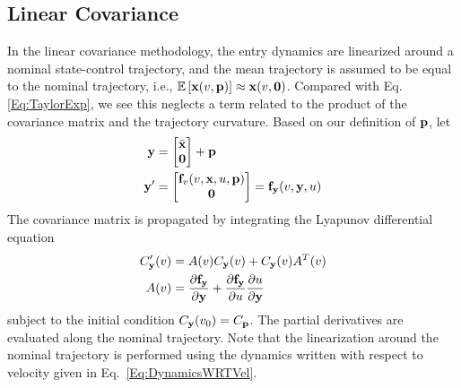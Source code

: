 
\subsection{Linear Covariance}
In the linear covariance methodology, the entry dynamics are linearized around a nominal state-control trajectory, and the mean trajectory is assumed to be equal to the nominal trajectory, i.e., $ \mathbb{E}\left[\mathbf{x}(v,\mathbf{p})\right] \approx \mathbf{x}(v,\mathbf{0}) $. Compared with Eq.\eqref{Eq:TaylorExp}, we see this neglects a term related to the product of the covariance matrix and the trajectory curvature. Based on our definition of $\mathbf{p}$, let 
\begin{align}
\mathbf{y} &= \begin{bmatrix}
		\bar{\mathbf{x}} \\ 
		\mathbf{0}
	 \end{bmatrix} + \mathbf{p}\\
\mathbf{y}' &= \begin{bmatrix}
	\mathbf{f}_{v}(v,\mathbf{x},u,\mathbf{p}) \\ 
	\mathbf{0}
\end{bmatrix} = \mathbf{f}_{\mathbf{y}}(v,\mathbf{y},u)
\end{align}
The covariance matrix is propagated by integrating the Lyapunov differential equation
\begin{align}
	\cov'_{\y}(v) &= A(v)\cov_{\y}(v) + \cov_{\y}(v)A^T(v) \\
	A(v) &= \frac{\partial \dynamics_{\y}}{\partial\y} + 
	\frac{\partial \dynamics_{\y}}{\partial u}\frac{\partial u}{\partial\y} %
	\end{align}
subject to the initial condition $C_{\mathbf{y}}(v_0) = C_{\mathbf{p}}$. The partial derivatives are evaluated along the nominal trajectory. Note that the linearization around the nominal trajectory is performed using the dynamics written with respect to velocity given in Eq.~\eqref{Eq:DynamicsWRTVel}. 


